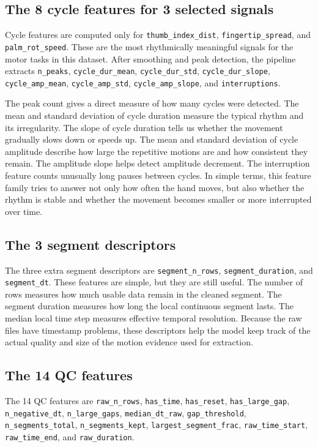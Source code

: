 \documentclass[10pt,twocolumn]{article}
\begin{document}
\subsection{The 8 cycle features for 3 selected signals}
Cycle features are computed only for \texttt{thumb\_index\_dist}, \texttt{fingertip\_spread}, and \texttt{palm\_rot\_speed}. These are the most rhythmically meaningful signals for the motor tasks in this dataset. After smoothing and peak detection, the pipeline extracts \texttt{n\_peaks}, \texttt{cycle\_dur\_mean}, \texttt{cycle\_dur\_std}, \texttt{cycle\_dur\_slope}, \texttt{cycle\_amp\_mean}, \texttt{cycle\_amp\_std}, \texttt{cycle\_amp\_slope}, and \texttt{interruptions}.

The peak count gives a direct measure of how many cycles were detected. The mean and standard deviation of cycle duration measure the typical rhythm and its irregularity. The slope of cycle duration tells us whether the movement gradually slows down or speeds up. The mean and standard deviation of cycle amplitude describe how large the repetitive motions are and how consistent they remain. The amplitude slope helps detect amplitude decrement. The interruption feature counts unusually long pauses between cycles. In simple terms, this feature family tries to answer not only how often the hand moves, but also whether the rhythm is stable and whether the movement becomes smaller or more interrupted over time.

\subsection{The 3 segment descriptors}
The three extra segment descriptors are \texttt{segment\_n\_rows}, \texttt{segment\_duration}, and \texttt{segment\_dt}. These features are simple, but they are still useful. The number of rows measures how much usable data remain in the cleaned segment. The segment duration measures how long the local continuous segment lasts. The median local time step measures effective temporal resolution. Because the raw files have timestamp problems, these descriptors help the model keep track of the actual quality and size of the motion evidence used for extraction.

\subsection{The 14 QC features}
The 14 QC features are \texttt{raw\_n\_rows}, \texttt{has\_time}, \texttt{has\_reset}, \texttt{has\_large\_gap}, \texttt{n\_negative\_dt}, \texttt{n\_large\_gaps}, \texttt{median\_dt\_raw}, \texttt{gap\_threshold}, \texttt{n\_segments\_total}, \texttt{n\_segments\_kept}, \texttt{largest\_segment\_frac}, \texttt{raw\_time\_start}, \texttt{raw\_time\_end}, and \texttt{raw\_duration}.
\end{document}
